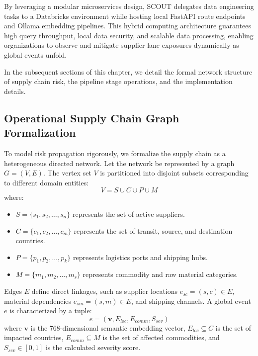 \documentclass[12pt]{report}
\begin{document}
By leveraging a modular microservices design, SCOUT delegates data engineering tasks to a Databricks environment while hosting local FastAPI route endpoints and Ollama embedding pipelines. This hybrid computing architecture guarantees high query throughput, local data security, and scalable data processing, enabling organizations to observe and mitigate supplier lane exposures dynamically as global events unfold.

In the subsequent sections of this chapter, we detail the formal network structure of supply chain risk, the pipeline stage operations, and the implementation details.

\newpage
\subsection{Operational Supply Chain Graph Formalization}
To model risk propagation rigorously, we formalize the supply chain as a heterogeneous directed network. Let the network be represented by a graph $G = (V, E)$. The vertex set $V$ is partitioned into disjoint subsets corresponding to different domain entities:
\begin{equation}
    V = S \cup C \cup P \cup M
\end{equation}
where:
\begin{itemize}
    \item $S = \{s_1, s_2, \dots, s_n\}$ represents the set of active suppliers.
    \item $C = \{c_1, c_2, \dots, c_m\}$ represents the set of transit, source, and destination countries.
    \item $P = \{p_1, p_2, \dots, p_k\}$ represents logistics ports and shipping hubs.
    \item $M = \{m_1, m_2, \dots, m_r\}$ represents commodity and raw material categories.
\end{itemize}

Edges $E$ define direct linkages, such as supplier locations $e_{sc} = (s, c) \in E$, material dependencies $e_{sm} = (s, m) \in E$, and shipping channels. A global event $e$ is characterized by a tuple:
\begin{equation}
    e = (\mathbf{v}, E_{loc}, E_{comm}, S_{sev})
\end{equation}
where $\mathbf{v}$ is the 768-dimensional semantic embedding vector, $E_{loc} \subseteq C$ is the set of impacted countries, $E_{comm} \subseteq M$ is the set of affected commodities, and $S_{sev} \in [0, 1]$ is the calculated severity score.
\end{document}

